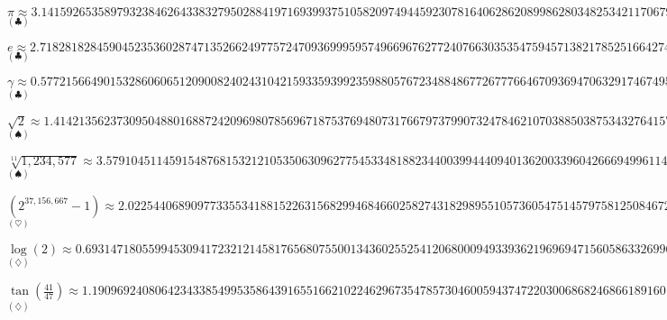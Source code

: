 \begin{flushleft}

\large

\vspace{0.0pt} $\pi \approx
3.1415926535897932384626433832795028841971693993751058209749445923078164062862089986280348253421170679821480865132823066470938446095505822317254...$ {\large{$^{\left ( \clubsuit \right )}$}}

\vspace{7.0pt} $e \approx
2.7182818284590452353602874713526624977572470936999595749669676277240766303535475945713821785251664274274663919320030599218174135966290435729003...$ {\large{$^{\left ( \clubsuit \right )}$}}

\vspace{7.0pt} $\gamma \approx
0.5772156649015328606065120900824024310421593359399235988057672348848677267776646709369470632917467495146314472498070824809605040144865428362242...$ {\large{$^{\left ( \clubsuit \right )}$}}

\vspace{7.0pt} $\sqrt{2} \approx
1.4142135623730950488016887242096980785696718753769480731766797379907324784621070388503875343276415727350138462309122970249248360558507372126...$ {\large{$^{\left ( \spadesuit \right )}$}}

\vspace{7.0pt} $\sqrt[11]{1,234,577} \approx
3.57910451145915487681532121053506309627754533481882344003994440940136200339604266694996114366514005002409791225386897818159590806723...$ {\large{$^{\left ( \spadesuit \right )}$}}

\vspace{7.0pt} $\left ( 2^{37,156,667} - 1 \right ) \approx
2.022544068909773355341881522631568299468466025827431829895510573605475145797581250846721390095896345301420966744889977095...\times 10^{11,185,271}$ {\large{$^{\left ( \heartsuit \right )}$}}

\vspace{7.0pt} $\log(2) \approx
0.69314718055994530941723212145817656807550013436025525412068000949339362196969471560586332699641868754200148102057068573368552023575813056...$ {\large{$^{\left ( \diamondsuit \right )}$}} 

\vspace{7.0pt} $\tan \left( \frac{41}{47} \right ) \approx
1.1909692408064234338549953586439165516621022462967354785730460059437472203006868246866189160185918907909477566880071350467953922525099063...$ {\large{$^{\left ( \diamondsuit \right )}$}}


\end{flushleft}
